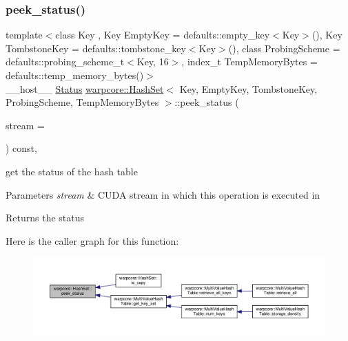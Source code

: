 \subsubsection{\texorpdfstring{peek\+\_\+status()}{peek\_status()}}
{\footnotesize\ttfamily template$<$class Key , Key Empty\+Key = defaults\+::empty\+\_\+key$<$\+Key$>$(), Key Tombstone\+Key = defaults\+::tombstone\+\_\+key$<$\+Key$>$(), class Probing\+Scheme  = defaults\+::probing\+\_\+scheme\+\_\+t$<$\+Key, 16$>$, index\+\_\+t Temp\+Memory\+Bytes = defaults\+::temp\+\_\+memory\+\_\+bytes()$>$ \\
\+\_\+\+\_\+host\+\_\+\+\_\+ \hyperlink{classwarpcore_1_1Status}{Status} \hyperlink{classwarpcore_1_1HashSet}{warpcore\+::\+Hash\+Set}$<$ Key, Empty\+Key, Tombstone\+Key, Probing\+Scheme, Temp\+Memory\+Bytes $>$\+::peek\+\_\+status (\begin{DoxyParamCaption}\item[{cuda\+Stream\+\_\+t}]{stream = {} }\end{DoxyParamCaption}) const\hspace{0.3cm}{\ttfamily [inline]}, {\ttfamily [noexcept]}}



get the status of the hash table 


\begin{DoxyParams}{Parameters}
{\em stream} & C\+U\+DA stream in which this operation is executed in \\
\hline
\end{DoxyParams}
\begin{DoxyReturn}{Returns}
the status 
\end{DoxyReturn}
Here is the caller graph for this function\+:
\nopagebreak
\begin{figure}[H]
\begin{center}
\leavevmode
\includegraphics[width=350pt]{classwarpcore_1_1HashSet_a15b81a16c6fbdb88dee1fd8c05a9fdbd_icgraph}
\end{center}
\end{figure}
\mbox{\label{classwarpcore_1_1HashSet_ae9a6c692c64bbc40bb6abd3372b946d1}} 
